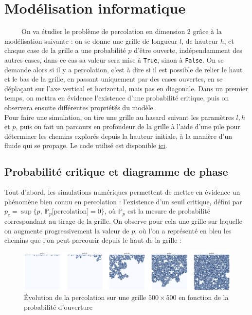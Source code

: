 \documentclass[11pt,a4paper]{article}
\begin{document}
\section{Modélisation informatique}
\ \ \ \ \ On va étudier le problème de percolation en dimension $2$ grâce à la modélisation suivante : on se donne une grille de longueur $l$, de hauteur $h$, et chaque case de la grille a une probabilité $p$ d'être ouverte, indépendamment des autres cases, dans ce cas sa valeur sera mise à \verb|True|, sinon à \verb|False|. On se demande alors si il y a percolation, c'est à dire si il est possible de relier le haut et le bas de la grille, en passant uniquement par des cases ouvertes, en se déplaçant sur l'axe vertical et horizontal, mais pas en diagonale. Dans un premier temps, on mettra en évidence l'existence d'une probabilité critique, puis on observera ensuite différentes propriétés du modèle. \\
Pour faire une simulation, on tire une grille au hasard suivant les paramètres $l,h$ et $p$, puis on fait un parcours en profondeur de la grille à l'aide d'une pile pour déterminer les chemins explorés depuis la hauteur initiale, à la manière d'un fluide qui se propage. Le code utilisé est disponible \href{https://github.com/Hazdard/Percolation/blob/main/percolation.ipynb}{ici}.

\subsection{Probabilité critique et diagramme de phase}

Tout d'abord, les simulations numériques permettent de mettre en évidence un phénomène bien connu en percolation : l'existence d'un seuil critique, défini par $p_c = \sup{ \{p, \ \mathbb{P}_p[\text{percolation]}=0 \} }$, où $ \mathbb{P}_p$ est la mesure de probabilité correspondant au tirage de la grille. On observe pour cela une grille sur laquelle on augmente progressivement la valeur de $p$, où l'on a représenté en bleu les chemins que l'on peut parcourir depuis le haut de la grille : 

\begin{figure}[htbp]
    \centering
    \includegraphics[width=1 \textwidth]{./Pictures/evolution.png}
    \caption{Évolution de la percolation sur une grille $500\times 500$ en fonction de la probabilité d'ouverture}
    \label{fig:evol}
\end{figure}
\end{document}
